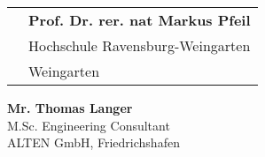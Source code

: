 \documentclass{scrartcl}
\begin{document}
\begin{center}
	  	\begin{spacing}{0.75}
	\begin{longtable}{p{} p{}}
	\hspace*{1cm}{\large\normalfont\bfseries Prof. Dr.-Ing Benedikt Reick} &  {\large\normalfont\bfseries Prof. Dr. rer. nat Markus Pfeil
} \\
\hspace*{1cm}{Hochschule Ravensburg-Weingarten} & {Hochschule Ravensburg-Weingarten}  \\ %
\hspace*{1cm}{Weingarten} & {Weingarten} 
	\end{longtable}	
	\end{spacing}
{\large\normalfont\bfseries \hspace*{-5mm}Mr. Thomas Langer}\\
{\hspace*{4mm}M.Sc. Engineering Consultant}\\
{\hspace*{4mm}ALTEN GmbH, Friedrichshafen}	
	
\end{center}

	
	
	
\end{document}
